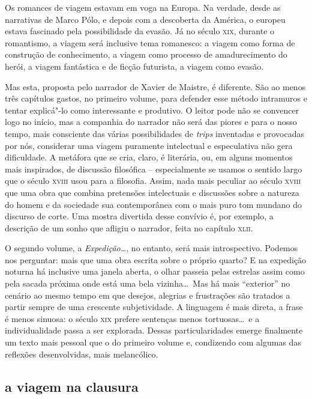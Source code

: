 Os romances de viagem estavam em voga na Europa. Na verdade, desde as
narrativas de Marco Pólo, e depois com a descoberta da América, o
europeu estava fascinado pela possibilidade da evasão. Já no século
\textsc{xix}, durante o romantismo, a viagem será inclusive tema romanesco: a
viagem como forma de construção de conhecimento, a viagem como processo
de amadurecimento do herói, a viagem fantástica e de ficção futurista,
a viagem como evasão.

Mas esta, proposta pelo narrador de Xavier de Maistre, é diferente. São
ao menos três capítulos gastos, no primeiro volume, para defender esse
método intramuros e tentar explicá"-lo como interessante e produtivo. O
leitor pode não se convencer logo no início, mas a companhia do
narrador não será das piores e para o nosso tempo, mais consciente das
várias possibilidades de \textit{trips} inventadas e provocadas por
nós, considerar uma viagem puramente intelectual e especulativa não
gera dificuldade. A metáfora que se cria, claro, é literária, ou, em
alguns momentos mais inspirados, de discussão filosófica --
especialmente se usamos o sentido largo que o século \textsc{xviii} usou para a        %
filosofia. Assim, nada mais peculiar ao século \textsc{xviii} que uma obra que combina
pretensões intelectuais e discussões sobre a natureza do homem e da
sociedade sua contemporânea com o mais puro tom mundano do discurso de                %
corte. Uma mostra divertida desse convívio é, por exemplo, a descrição
de um sonho que afligiu o narrador, feita no capítulo \textsc{xlii}.

 O segundo volume, a \textit{Expedição\ldots}, no entanto, será mais
introspectivo. Podemos nos perguntar: mais que uma obra escrita sobre o
próprio quarto? E na expedição noturna há inclusive uma janela aberta,
o olhar passeia pelas estrelas assim como pela sacada próxima onde está
uma bela vizinha\ldots\ Mas há mais ``exterior'' no cenário ao mesmo tempo em
que desejos, alegrias e frustrações são tratados a partir sempre de uma
crescente subjetividade. A linguagem é mais direta, a frase é menos
sinuosa: o século \textsc{xix} prefere sentenças menos tortuosas\ldots\ e a
individualidade passa a ser explorada. Dessas particularidades emerge
finalmente um texto mais pessoal que o do primeiro volume e, condizendo
com algumas das reflexões desenvolvidas, mais melancólico. 

\subsection{a viagem na clausura}

